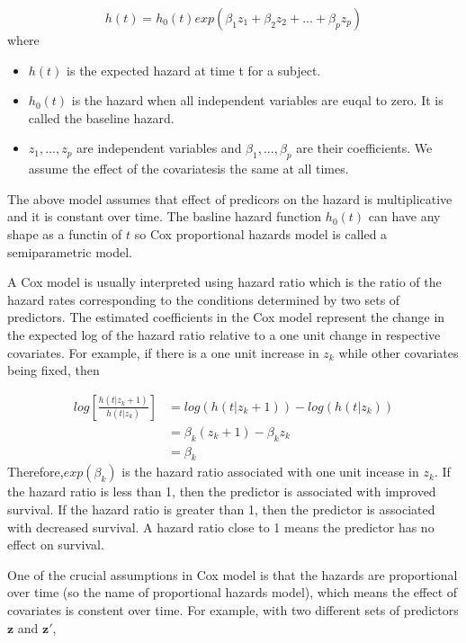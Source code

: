\documentclass{article}
\numberwithin{equation}{section}
\begin{document}
\begin{equation}
h(t)=h_0(t)exp(\beta_1z_1+\beta_2z_2+...+\beta_pz_p)
\end{equation}
where 
\begin{itemize}[leftmargin=1.5in]
	\item $h(t)$ is the expected hazard at time t for a subject.
	\item $h_0(t)$ is the hazard when all independent variables are euqal to zero. It is called the baseline hazard.
	\item $z_1,...,z_p$ are independent variables and $\beta_1,...,\beta_p$ are their coefficients. We assume the effect of the covariatesis the same at all times.
\end{itemize}
The above model assumes that effect of predicors on the hazard is multiplicative and it is constant over time. The basline hazard function $h_0(t)$ can have any shape as a functin of $t$ so Cox proportional hazards model is called a semiparametric model. 

A Cox model is usually interpreted using hazard ratio which is the ratio of the hazard rates corresponding to the conditions determined by two sets of predictors. The estimated coefficients in the Cox model represent the change in the expected log of the hazard ratio relative to a one unit change in respective covariates. For example, if there is a one unit increase in $z_k$ while other covariates being fixed, then

\begin{equation}
\begin{split}
log\left[\frac{h(t|z_k+1)}{h(t|z_k)}\right] &=log(h(t|z_k+1)) - log(h(t|z_k)) \\
&= \beta_k(z_k+1) - \beta_kz_k \\
&= \beta_k
\end{split}
\end{equation}
Therefore,$exp(\beta_k)$ is the hazard ratio associated with one unit incease in $z_k$. If the hazard ratio is less than 1, then the predictor is associated with improved survival. If the hazard ratio is greater than 1, then the predictor is associated with decreased survival. A hazard ratio close to 1 means the predictor has no effect on survival.

One of the crucial assumptions in Cox model is that the hazards are proportional over time (so the name of proportional hazards model), which means the effect of covariates is constent over time. For example, with two different sets of predictors $\bm{z}$ and $\bm{z'}$, 
\end{document}
